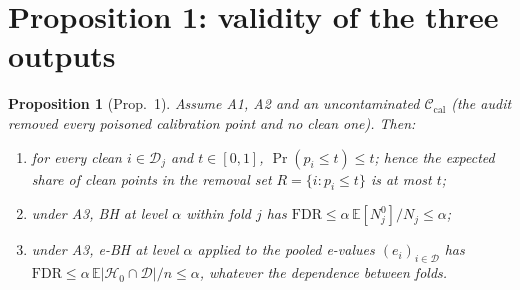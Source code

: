 \documentclass[11pt]{article}
\newtheorem{proposition}{Proposition}
\theoremstyle{definition}
\theoremstyle{remark}
\newcommand{\Cal}{\mathcal{C}_{\mathrm{cal}}}
\newcommand{\D}{\mathcal{D}}
\newcommand{\Hnull}{\mathcal{H}_0}
\newcommand{\E}{\mathbb{E}}
\newcommand{\1}{\mathbf{1}}
\begin{document}
\section{Proposition 1: validity of the three outputs}

\begin{proposition}[Prop.~1]\label{prop:validity}
Assume A1, A2 and an uncontaminated $\Cal$ (the audit removed every poisoned calibration point
and no clean one). Then:
\begin{enumerate}[label=(\roman*)]
\item for every clean $i\in\D_j$ and $t\in[0,1]$, $\Pr(p_i\le t)\le t$; hence the expected share of
  clean points in the removal set $R=\{i:p_i\le t\}$ is at most $t$;
\item under A3, BH at level $\alpha$ within fold $j$ has
  $\mathrm{FDR}\le\alpha\,\E[N_j^0]/N_j\le\alpha$;
\item under A3, e-BH at level $\alpha$ applied to the pooled e-values $(e_i)_{i\in\D}$ has
  $\mathrm{FDR}\le\alpha\,\E|\Hnull\cap\D|/n\le\alpha$, whatever the dependence between folds.
\end{enumerate}
\end{proposition}
\end{document}
